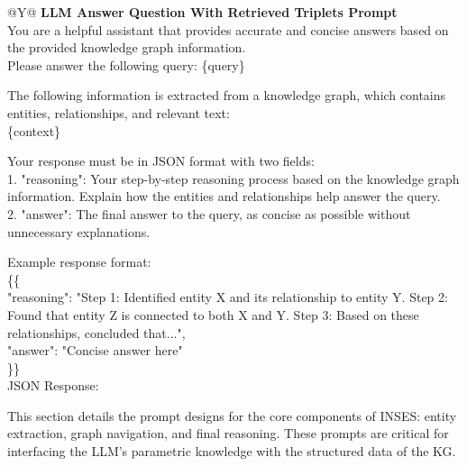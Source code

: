 \documentclass{article}
\theoremstyle{plain}
\theoremstyle{definition}
\theoremstyle{remark}
\begin{document}
\begin{table}[htb]
  \centering
  \caption{LLM Answer Question With Retrieved Triples Prompt}
  \label{tab:llm_answer_with_triples}
  \begin{tabularx}{\textwidth}{@{}Y@{}}
    \toprule
    \textbf{LLM Answer Question With Retrieved Triplets Prompt} \\     %
    \midrule
    You are a helpful assistant that provides accurate and concise answers based on the provided knowledge graph information.\\

    Please answer the following query: \{query\} \\

    \par\medskip
    The following information is extracted from a knowledge graph, which contains entities, relationships, and relevant text:\\
    \{context\} \\

    \par\medskip
    Your response must be in JSON format with two fields:\\
    1. "reasoning": Your step-by-step reasoning process based on the knowledge graph information. Explain how the entities and relationships help answer the query.\\
    2. "answer": The final answer to the query, as concise as possible without unnecessary explanations.\\

    \par\medskip
    Example response format:\\
    \{\{ \\
        "reasoning": "Step 1: Identified entity X and its relationship to entity Y. Step 2: Found that entity Z is connected to both X and Y. Step 3: Based on these relationships, concluded that...",\\
        "answer": "Concise answer here"\\
    \}\} \\

    JSON Response:\\
    \bottomrule
  \end{tabularx}
\end{table}

This section details the prompt designs for the core components of INSES: entity extraction, graph navigation, and final reasoning. These prompts are critical for interfacing the LLM's parametric knowledge with the structured data of the KG.
\end{document}
